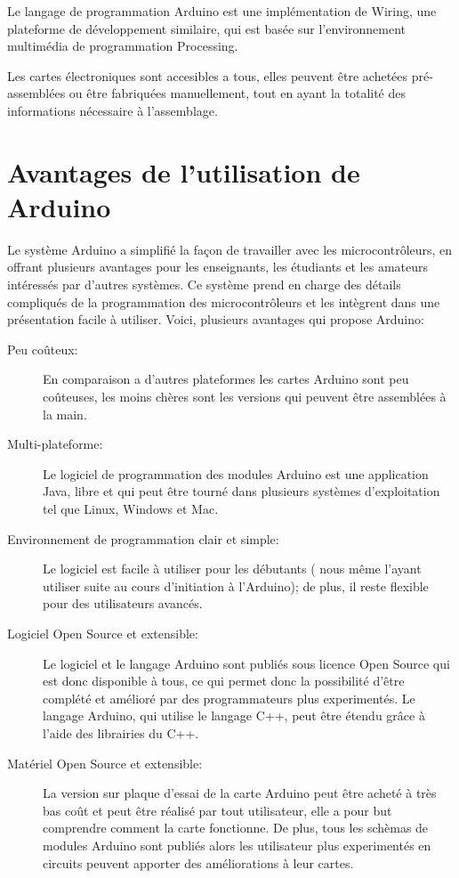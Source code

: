 Le langage de programmation Arduino est une implémentation de Wiring, une plateforme de développement similaire, qui est basée sur l'environnement 
multimédia de programmation Processing.

Les cartes électroniques sont accesibles a tous, elles peuvent être achetées pré-assemblées ou être fabriquées manuellement, tout en ayant la totalité des
informations nécessaire à l'assemblage.

\section{Avantages de l'utilisation de Arduino}

Le système Arduino a simplifié la façon de travailler avec les microcontrôleurs, en offrant plusieurs avantages pour les enseignants, les étudiants et 
les amateurs intéressés par d'autres systèmes. Ce système prend en charge des détails compliqués de la programmation des microcontrôleurs et les intègrent
dans une présentation facile à utiliser. Voici, plusieurs avantages qui propose Arduino:

\begin{description}
 \item[Peu coûteux:] En comparaison a d'autres plateformes les cartes Arduino sont peu coûteuses, les moins chères sont les versions qui peuvent être 
assemblées à la main.
 \item[Multi-plateforme:] Le logiciel de programmation des modules Arduino est une application Java, libre et qui peut être tourné dans plusieurs systèmes
d'exploitation tel que Linux, Windows et Mac.
 \item[Environnement de programmation clair et simple:] Le logiciel est facile à utiliser pour les débutants ( nous même l'ayant utiliser suite au cours
d'initiation à l'Arduino); de plus, il reste flexible pour des utilisateurs avancés.
 \item[Logiciel Open Source et extensible:] Le logiciel et le langage Arduino sont publiés sous licence Open Source qui est donc disponible à tous, ce qui 
permet donc la possibilité d'être complété et amélioré par des programmateurs plus experimentés. Le langage Arduino, qui utilise le langage C++, peut
être étendu grâce à l'aide des librairies du C++.
 \item[Matériel Open Source et extensible:] La version sur plaque d'essai de la carte Arduino peut être acheté à très bas coût et peut être réalisé par
tout utilisateur, elle a pour but comprendre comment la carte fonctionne. De plus, tous les schèmas de modules Arduino sont publiés alors les 
utilisateur plus experimentés en circuits peuvent apporter des améliorations à leur cartes.
\end{description}


